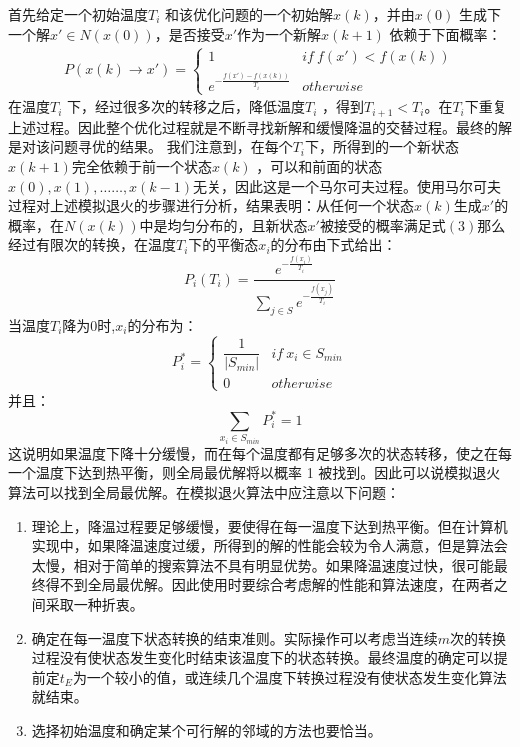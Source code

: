 \documentclass[10.5pt,twocolumn]{jbuaa}
\begin{document}
首先给定一个初始温度$T_{i}$ 和该优化问题的一个初始解$x(k)$，并由$x(0)$ 生成下一个解$x'\in N(x(0))$，是否接受$x'$作为一个新解$x(k+1)$ 依赖于下面概率：
\begin{align}
P(x(k)\rightarrow x')=\begin{cases}
1 &if\ f(x')<f(x(k))\\
e^{-\frac{f(x')-f(x(k))}{T_{i}}} &otherwise
\end{cases}
\end{align}
在温度$T_{i}$ 下，经过很多次的转移之后，降低温度$T_{i}$ ，得到$T_{i+1} <T_{i}$。在$T_{i}$下重复上述过程。因此整个优化过程就是不断寻找新解和缓慢降温的交替过程。最终的解是对该问题寻优的结果。
我们注意到，在每个$T_{i}$下，所得到的一个新状态$x(k+1)$完全依赖于前一个状态$x(k)$ ，可以和前面的状态 $x(0),x(1),……,x(k-1)$无关，因此这是一个马尔可夫过程。使用马尔可夫过程对上述模拟退火的步骤进行分析，结果表明：从任何一个状态$x(k)$生成$x'$的概率，在$N(x(k))$中是均匀分布的，且新状态$x'$被接受的概率满足式$(3)$那么经过有限次的转换，在温度$T_{i}$下的平衡态$x_{i}$的分布由下式给出：
\begin{equation}
P_{i}(T_{i})=\frac{e^{-\frac{f(x_{i})}{T_{i}}}}{\underset{j\in S}{\sum}e^{-\frac{f(x_{j})}{T_{i}}}}
\end{equation}
  当温度$T_{i}$降为0时,$x_{i}$的分布为：
\begin{equation}
P_{i}^{*}=\begin{cases}
\dfrac{1}{|S_{min}|}&if\ x_{i}\in S_{min}\\
0 & otherwise
\end{cases}
\end{equation}
  并且：
\begin{equation}
\underset{x_{i}\in S_{min}}{\sum}P_{i}^{*}=1
\end{equation}
  这说明如果温度下降十分缓慢，而在每个温度都有足够多次的状态转移，使之在每一个温度下达到热平衡，则全局最优解将以概率 1 被找到。因此可以说模拟退火算法可以找到全局最优解。在模拟退火算法中应注意以下问题：
 \begin{enumerate}[label=(\alph*) ]
 	\item 理论上，降温过程要足够缓慢，要使得在每一温度下达到热平衡。但在计算机实现中，如果降温速度过缓，所得到的解的性能会较为令人满意，但是算法会太慢，相对于简单的搜索算法不具有明显优势。如果降温速度过快，很可能最终得不到全局最优解。因此使用时要综合考虑解的性能和算法速度，在两者之间采取一种折衷。
 	\item 确定在每一温度下状态转换的结束准则。实际操作可以考虑当连续$m$次的转换过程没有使状态发生变化时结束该温度下的状态转换。最终温度的确定可以提前定$t_{E}$为一个较小的值，或连续几个温度下转换过程没有使状态发生变化算法就结束。
 	\item 选择初始温度和确定某个可行解的邻域的方法也要恰当。
 \end{enumerate}
\end{document}
